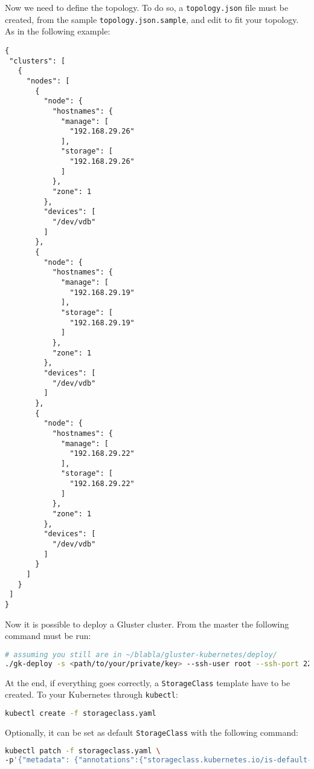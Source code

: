 Now we need to define the topology. To do so, a \texttt{topology.json}
file must be created, from the sample \texttt{topology.json.sample}, and edit to
fit your topology. As in the following example:

\begin{lstlisting}
{
 "clusters": [
   {
     "nodes": [
       {
         "node": {
           "hostnames": {
             "manage": [
               "192.168.29.26"
             ],
             "storage": [
               "192.168.29.26"
             ]
           },
           "zone": 1
         },
         "devices": [
           "/dev/vdb"
         ]
       },
       {
         "node": {
           "hostnames": {
             "manage": [
               "192.168.29.19"
             ],
             "storage": [
               "192.168.29.19"
             ]
           },
           "zone": 1
         },
         "devices": [
           "/dev/vdb"
         ]
       },
       {
         "node": {
           "hostnames": {
             "manage": [
               "192.168.29.22"
             ],
             "storage": [
               "192.168.29.22"
             ]
           },
           "zone": 1
         },
         "devices": [
           "/dev/vdb"
         ]
       }
     ]
   }
 ]
}
\end{lstlisting}

Now it is possible to deploy a Gluster cluster. From the master the following
command must be run:

\begin{lstlisting}[language=bash]
# assuming you still are in ~/blabla/gluster-kubernetes/deploy/
./gk-deploy -s <path/to/your/private/key> --ssh-user root --ssh-port 22 topology.json -y
\end{lstlisting}

At the end, if everything goes correctly, a \texttt{StorageClass} template have
to be created. To your Kubernetes through \texttt{kubectl}:

\begin{lstlisting}[language=bash]
kubectl create -f storageclass.yaml
\end{lstlisting}

Optionally, it can be set as default \texttt{StorageClass} with the following
command:

\begin{lstlisting}[language=bash]
kubectl patch -f storageclass.yaml \
-p'{"metadata": {"annotations":{"storageclass.kubernetes.io/is-default-class":"true"}}}'
\end{lstlisting}

